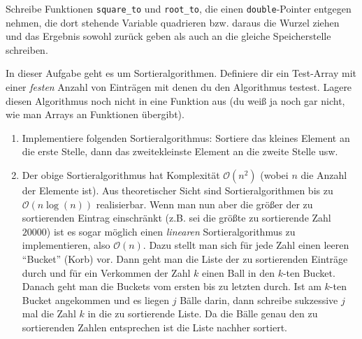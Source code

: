 \documentclass{uebungszettel}
\begin{document}
\begin{aufg}
Schreibe Funktionen \verb|square_to| und \verb|root_to|, die einen \verb|double|-Pointer entgegen nehmen, die dort stehende Variable quadrieren bzw. daraus die Wurzel ziehen und das Ergebnis sowohl zurück geben als auch an die gleiche Speicherstelle schreiben.
\end{aufg}

\begin{aufg} In dieser Aufgabe geht es um Sortieralgorithmen. Definiere dir ein Test-Array mit einer \emph{festen} Anzahl von Einträgen mit denen du den Algorithmus testest. Lagere diesen Algorithmus noch nicht in eine Funktion aus (du weiß ja noch gar nicht, wie man Arrays an Funktionen übergibt).
\begin{enumerate} 
\item Implementiere folgenden Sortieralgorithmus: Sortiere das kleines Element an die erste Stelle, dann das zweitekleinste Element an die zweite Stelle usw.
\item Der obige Sortieralgorithmus hat Komplexität $\mathcal O(n^2)$ (wobei $n$ die Anzahl der Elemente ist). Aus theoretischer Sicht sind Sortieralgorithmen bis zu $\mathcal O(n \log(n))$ realisierbar. Wenn man nun aber die größer der zu sortierenden Eintrag einschränkt (z.B. sei die größte zu sortierende Zahl $20000$) ist es sogar möglich einen \emph{linearen} Sortieralgorithmus zu implementieren, also $\mathcal O(n)$. Dazu stellt man sich für jede Zahl einen leeren ``Bucket'' (Korb) vor. Dann geht man die Liste der zu sortierenden Einträge durch und für ein Verkommen der Zahl $k$ einen Ball in den $k$-ten Bucket. Danach geht man die Buckets vom ersten bis zu letzten durch. Ist am $k$-ten Bucket angekommen und es liegen $j$ Bälle darin, dann schreibe sukzessive $j$ mal die Zahl $k$ in die zu sortierende Liste. Da die Bälle genau den zu sortierenden Zahlen entsprechen ist die Liste nachher sortiert. 
\end{enumerate}
\end{aufg}
\end{document}
